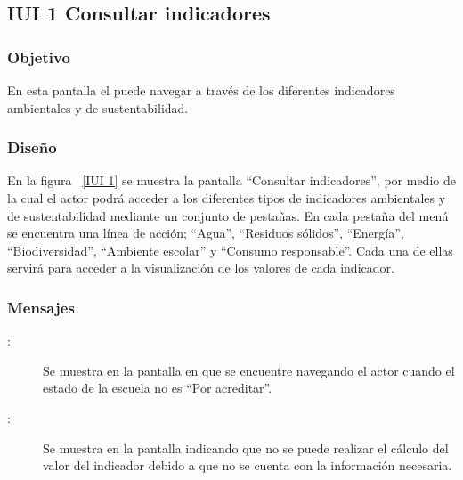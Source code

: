 \subsection{IUI 1 Consultar indicadores}
\subsubsection{Objetivo}
	
	En esta pantalla el  puede navegar a través de los 
	diferentes indicadores ambientales y de sustentabilidad.

\subsubsection{Diseño}

    En la figura ~\ref{IUI 1} se muestra la pantalla ``Consultar indicadores'', por medio de la cual el actor podrá 
    acceder a los diferentes tipos de indicadores ambientales y de sustentabilidad mediante un conjunto de pestañas. En cada pestaña del menú se encuentra
    una línea de acción; ``Agua'', ``Residuos sólidos'', ``Energía'', ``Biodiversidad'', ``Ambiente escolar'' y ``Consumo responsable''. Cada una de ellas
    servirá para acceder a la visualización de los valores de cada indicador.


\subsubsection{Mensajes}

	
\begin{description}
	\item[:] Se muestra en la pantalla en que se encuentre navegando el actor cuando el estado de la escuela no es ``Por acreditar''.
	\item[:] Se muestra en la pantalla  indicando que no se puede realizar el cálculo del valor del indicador
				     debido a que no se cuenta con la información necesaria.
\end{description}
